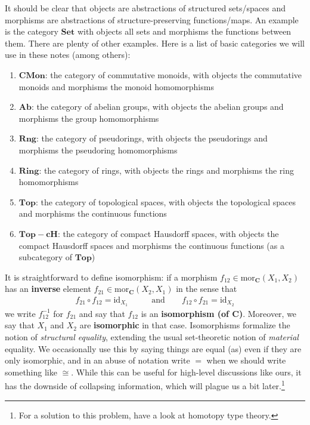 It should be clear that objects are abstractions of structured sets/spaces and morphisms are abstractions of structure-preserving functions/maps.
An example is the category $\mathbf{Set}$ with objects all sets and morphisms the functions between them.
There are plenty of other examples.
Here is a list of basic categories we will use in these notes (among others):
\begin{enumerate}
\item[$\bullet$]
  $\mathbf{CMon}$: the category of commutative monoids, with objects the commutative monoids and morphisms the monoid homomorphisms
\item[$\bullet$]
  $\mathbf{Ab}$: the category of abelian groups, with objects the abelian groups and morphisms the group homomorphisms
\item[$\bullet$]
  $\mathbf{Rng}$: the category of pseudorings, with objects the pseudorings and morphisms the pseudoring homomorphisms
\item[$\bullet$]
  $\mathbf{Ring}$: the category of rings, with objects the rings and morphisms the ring homomorphisms
\item[$\bullet$]
  $\mathbf{Top}$: the category of topological spaces, with objects the topological spaces and morphisms the continuous functions
\item[$\bullet$]
  $\mathbf{Top-cH}$: the category of compact Hausdorff spaces, with objects the compact Hausdorff spaces and morphisms the continuous functions (as a subcategory of $\mathbf{Top}$)
\end{enumerate}
It is straightforward to define isomorphism: if a morphism $f_{12} \in \mathrm{mor}_{\mathbf{C}}(X_{1},X_{2})$ has an \textbf{inverse} element $f_{21} \in \mathrm{mor}_{\mathbf{C}}(X_{2},X_{1})$ in the sense that
\begin{align*}
  f_{21}
  \circ
  f_{12}
  =
  \mathrm{id}_{X_{1}}
  \qquad
  &\text{and}
  \qquad
  f_{12}
  \circ
  f_{21}
  =
  \mathrm{id}_{X_{2}}
\end{align*}
we write $f_{12}^{-1}$ for $f_{21}$ and say that $f_{12}$ is an \textbf{isomorphism (of $\mathbf{C}$)}.
Moreover, we say that $X_{1}$ and $X_{2}$ are \textbf{isomorphic} in that case.
Isomorphisms formalize the notion of \textit{structural equality}, extending the usual set-theoretic notion of \textit{material} equality.
We occasionally use this by saying things are {\glqq}equal (as){\grqq} even if they are only isomorphic, and in an abuse of notation write $=$ when we should write something like $\cong$.
While this can be useful for high-level discussions like ours, it has the downside of collapsing information, which will plague us a bit later.\footnote{For a solution to this problem, have a look at homotopy type theory.}
